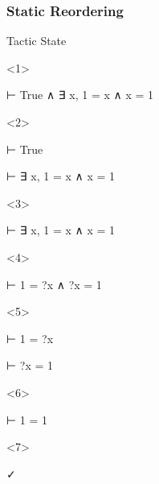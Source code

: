 \begin{frame}[fragile]
  \frametitle{Static Reordering}

  \begin{block}{Tactic State}
    \begin{onlyenv}<1>
      \begin{leancode}
        ⊢ True ∧ ∃ x, 1 = x ∧ x = 1


      \end{leancode}
    \end{onlyenv}
    \begin{onlyenv}<2>
      \begin{leancode}
        ⊢ True

        ⊢ ∃ x, 1 = x ∧ x = 1
      \end{leancode}
    \end{onlyenv}
    \begin{onlyenv}<3>
      \begin{leancode}
        ⊢ ∃ x, 1 = x ∧ x = 1


      \end{leancode}
    \end{onlyenv}
    \begin{onlyenv}<4>
      \begin{leancode}
        ⊢ 1 = ?x ∧ ?x = 1


      \end{leancode}
    \end{onlyenv}
    \begin{onlyenv}<5>
      \begin{leancode}
        ⊢ 1 = ?x

        ⊢ ?x = 1
      \end{leancode}
    \end{onlyenv}
    \begin{onlyenv}<6>
      \begin{leancode}
        ⊢ 1 = 1


      \end{leancode}
    \end{onlyenv}
    \begin{onlyenv}<7>
      \begin{leancode}
        ✓


      \end{leancode}
    \end{onlyenv}
  \end{block}


\end{frame}
